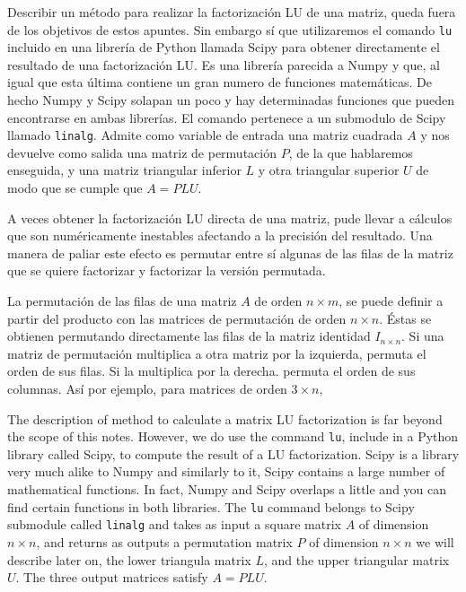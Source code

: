 \begin{paracol}{2}
Describir un método para realizar la factorización LU de una matriz, queda fuera de los objetivos de estos apuntes. Sin embargo sí que utilizaremos el comando \texttt{lu} incluido en una librería de Python llamada Scipy para obtener directamente el resultado de una factorización LU. Es una librería parecida a Numpy y que, al igual que esta última contiene un gran numero de funciones matemáticas. De hecho Numpy y Scipy solapan un poco y hay determinadas funciones que pueden encontrarse en ambas librerías. El comando pertenece a un submodulo de Scipy llamado \texttt{linalg}. Admite como variable de entrada una matriz cuadrada $A$ y nos devuelve como salida una matriz de permutación $P$, de la que hablaremos enseguida, y una matriz triangular inferior $L$ y otra triangular superior $U$ de modo que se cumple que $A =PLU$.

A veces obtener la factorización LU directa de una matriz, pude llevar a cálculos que son numéricamente inestables afectando a la precisión del resultado. Una manera de paliar este efecto es permutar entre sí algunas de las filas de la matriz que se quiere factorizar y factorizar la versión permutada.

La permutación de las filas de una matriz $A$ de orden $n\times m$, se puede definir a partir del producto con las matrices de permutación de orden $n \times n$. Éstas se obtienen permutando directamente las filas de la matriz identidad $I_{n \times n}$. Si una matriz de permutación multiplica a otra matriz por la izquierda, permuta el orden de sus filas. Si la multiplica por la derecha. permuta el orden de sus columnas. Así por ejemplo, para matrices de orden $3 \times n$,

\switchcolumn
The description of method to calculate a matrix LU factorization is far beyond the scope of this notes. However, we do use the command \texttt{lu}, include in a Python library called Scipy, to compute the result of a LU factorization. Scipy is a library very much alike to Numpy and similarly to it, Scipy contains a large number of mathematical functions. In fact, Numpy and Scipy overlaps a little and you can find certain functions in both libraries. The \texttt{lu} command belongs to Scipy submodule called \texttt{linalg} and takes as input a square matrix $A$ of dimension $n\times n$, and returns as outputs a permutation matrix $P$ of dimension $n\times n$ we will describe later on, the lower triangula matrix $L$, and the upper triangular matrix $U$. The three output matrices satisfy $A=PLU$.


\end{paracol}
